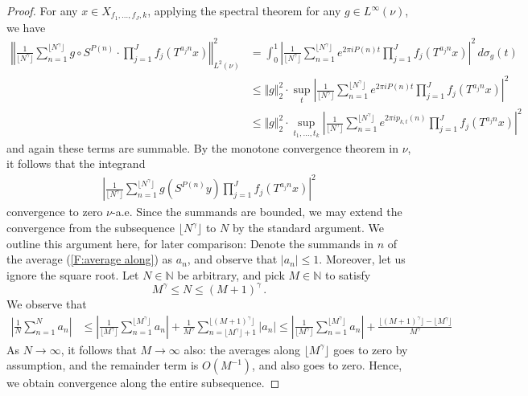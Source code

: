 \documentclass[11pt, oneside]{amsart}   	%
\newcommand{\1}{\mathbbm{1}}
\newcommand{\floor}[1]{\lfloor#1\rfloor}
\theoremstyle{definition}
\begin{document}
\begin{proof}
For any $x\in X_{f_1, \dots, f_J, k}$, applying the spectral theorem for any $g\in L^\infty(\nu)$, we have
\begin{align*}
\left\Vert \frac{1}{\floor{N^\gamma}} \sum_{n=1}^{\floor{N^\gamma}} g \circ S^{P(n)} \cdot \prod_{j=1}^J f_j (T^{a_j n} x)\right\Vert_{L^2(\nu)}^2 &= \int_0^1 \left| \frac{1}{\floor{N^\gamma}} \sum_{n=1}^{\floor{N^\gamma}} e^{2\pi i P(n) t} \prod_{j=1}^J f_j (T^{a_j n} x) \right|^2 \, d\sigma_g(t)  \\
& \leq \Vert g \Vert_2^2 \cdot \sup_t \left| \frac{1}{\floor{N^\gamma}} \sum_{n=1}^{\floor{N^\gamma}} e^{2\pi i P(n) t} \prod_{j=1}^J f_j (T^{a_j n} x) \right|^2 \\
& \leq \Vert g \Vert_2^2 \cdot \sup_{t_1, \dots, t_{k}} \left| \frac{1}{\floor{N^\gamma}} \sum_{n=1}^{\floor{N^\gamma}} e^{2\pi i p_{k, t}(n)} \prod_{j=1}^J f_j (T^{a_j n} x) \right|^2
\end{align*}
and again these terms are summable. By the monotone convergence theorem in $\nu$, it follows that the integrand
\begin{align}\label{F:average along}
\left|\frac{1}{\floor{N^\gamma}} \sum_{n=1}^{\floor{N^\gamma}} g( S^{P(n)} y) \prod_{j=1}^J f_j (T^{a_j n} x) \right|^2
\end{align}
convergence to zero $\nu$-a.e. Since the summands are bounded, we may extend the convergence from the subsequence $\floor{N^\gamma}$ to $N$ by the standard argument. We outline this argument here, for later comparison: Denote the summands in $n$ of the average (\ref{F:average along}) as $a_n$, and observe that $|a_n| \leq 1$. Moreover, let us ignore the square root. Let $N\in \mathbb{N}$ be arbitrary, and pick $M\in \mathbb{N}$ to satisfy
$$M^\gamma \leq N \leq (M+1)^\gamma \, .$$
We observe that
\begin{align*}
\left| \frac{1}{N}\sum_{n=1}^N a_n\right| &\leq \left|\frac{1}{\floor{M^\gamma}}\sum_{n=1}^{\floor{M^\gamma}} a_n\right| + \frac{1}{M^\gamma} \sum_{n = \floor{M^\gamma}+1}^{\floor{(M + 1)^\gamma}} |a_n| \leq \left|\frac{1}{\floor{M^\gamma}}\sum_{n=1}^{\floor{M^\gamma}} a_n\right| + \frac{\floor{(M + 1)^\gamma}-\floor{M^\gamma}}{M^\gamma} 
\end{align*}
As $N\to \infty$, it follows that $M \to \infty$ also: the averages along $\floor{M^\gamma}$ goes to zero by assumption, and the remainder term is $O(M^{-1})$, and also goes to zero. Hence, we obtain convergence along the entire subsequence.


\end{proof}
\end{document}
